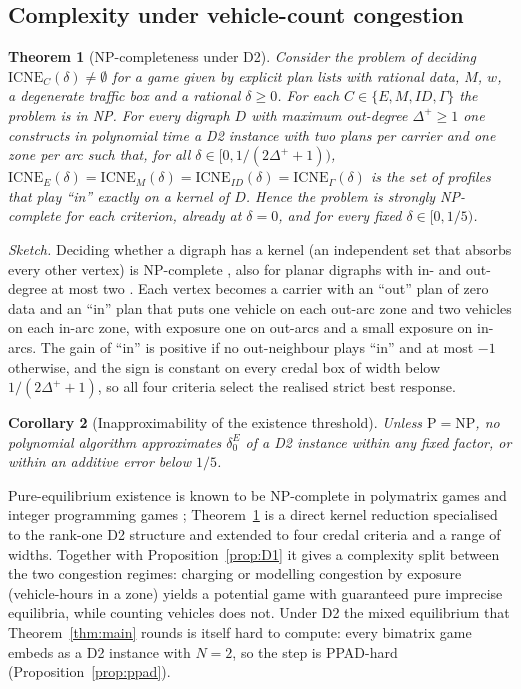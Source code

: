 \documentclass[preprint,11pt]{elsarticle}
\newtheorem{theorem}{Theorem}
\newtheorem{corollary}[theorem]{Corollary}
\theoremstyle{definition}
\theoremstyle{remark}
\newcommand{\ICNE}{\mathrm{ICNE}}
\begin{document}
\subsection{Complexity under vehicle-count congestion}

\begin{theorem}[NP-completeness under D2]\label{thm:np}
Consider the problem of deciding $\ICNE_C(\delta)\neq\emptyset$ for a game given by explicit plan lists with rational data, $M$, $w$, a degenerate traffic box and a rational $\delta\ge0$. For each $C\in\{E,M,ID,\Gamma\}$ the problem is in NP. For every digraph $D$ with maximum out-degree $\Delta^+\ge1$ one constructs in polynomial time a D2 instance with two plans per carrier and one zone per arc such that, for all $\delta\in[0,1/(2\Delta^++1))$, $\ICNE_E(\delta)=\ICNE_M(\delta)=\ICNE_{ID}(\delta)=\ICNE_\Gamma(\delta)$ is the set of profiles that play ``in'' exactly on a kernel of $D$. Hence the problem is strongly NP-complete for each criterion, already at $\delta=0$, and for every fixed $\delta\in[0,1/5)$.
\end{theorem}

\emph{Sketch.} Deciding whether a digraph has a kernel (an independent set that absorbs every other vertex) is NP-complete \citep{Chvatal1973}, also for planar digraphs with in- and out-degree at most two \citep{Fraenkel1981}. Each vertex becomes a carrier with an ``out'' plan of zero data and an ``in'' plan that puts one vehicle on each out-arc zone and two vehicles on each in-arc zone, with exposure one on out-arcs and a small exposure on in-arcs. The gain of ``in'' is positive if no out-neighbour plays ``in'' and at most $-1$ otherwise, and the sign is constant on every credal box of width below $1/(2\Delta^++1)$, so all four criteria select the realised strict best response.

\begin{corollary}[Inapproximability of the existence threshold]\label{cor:inapprox}
Unless $\mathrm P=\mathrm{NP}$, no polynomial algorithm approximates $\delta_0^E$ of a D2 instance within any fixed factor, or within an additive error below $1/5$.
\end{corollary}

Pure-equilibrium existence is known to be NP-complete in polymatrix games and integer programming games \citep{Apt2022,Carvalho2022}; Theorem~\ref{thm:np} is a direct kernel reduction specialised to the rank-one D2 structure and extended to four credal criteria and a range of widths. Together with Proposition~\ref{prop:D1} it gives a complexity split between the two congestion regimes: charging or modelling congestion by exposure (vehicle-hours in a zone) yields a potential game with guaranteed pure imprecise equilibria, while counting vehicles does not. Under D2 the mixed equilibrium that Theorem~\ref{thm:main} rounds is itself hard to compute: every bimatrix game embeds as a D2 instance with $N=2$, so the step is PPAD-hard \citep{Chen2009,Daskalakis2009} (Proposition~\ref{prop:ppad}).
\end{document}
